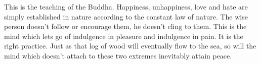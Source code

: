 This is the teaching of the Buddha. Happiness, unhappiness, love and hate are simply established in nature according to the constant law of nature. The wise person doesn't follow or encourage them, he doesn't cling to them. This is the mind which lets go of indulgence in pleasure and indulgence in pain. It is the right practice. Just as that log of wood will eventually flow to the sea, so will the mind which doesn't attach to these two extremes inevitably attain peace. 


